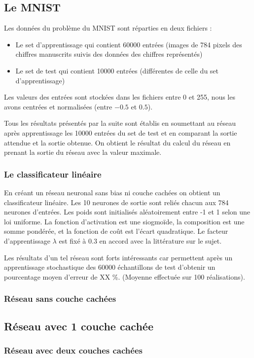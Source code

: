 
\subsection{Le MNIST}

Les données du problème du MNIST sont réparties en deux fichiers :
\begin{itemize}
    \item Le set d'apprentissage qui contient 60000 entrées (images de 784 pixels
          des chiffres manuscrits suivis des données des chiffres représentés)
    \item Le set de test qui contient 10000 entrées (différentes de celle du set
          d'apprentissage)
\end{itemize}

\medskip

Les valeurs des entrées sont stockées dans les fichiers entre 0 et 255, nous
les avons centrées et normalisées (entre $-0.5$ et $0.5$).

\medskip

Tous les résultats présentés par la suite sont établis en soumettant au réseau
après apprentissage les 10000 entrées du set de test et en comparant la sortie
attendue et la sortie obtenue. On obtient le résultat du calcul du réseau en
prenant la sortie du réseau avec la valeur maximale.

\subsubsection{Le classificateur linéaire}

En créant un réseau neuronal sans bias ni couche cachées on obtient un
classificateur linéaire. Les 10 neurones de sortie sont reliés chacun aux 784
neurones d'entrées. Les poids sont initialisés aléatoirement entre -1 et 1 selon
 une loi uniforme. La fonction d'activation est une siogmoïde, la composition
est une somme pondérée, et la fonction de coût est l'écart quadratique. Le
facteur d'apprentissage $\lambda$ est fixé à $0.3$ en accord avec la littérature
 sur le sujet.


\medskip

Les résultats d'un tel réseau sont forts intéressants car permettent après un
apprentissage stochastique des 60000 échantillons de test d'obtenir un
pourcentage moyen d'erreur de XX \%. (Moyenne effectuée sur 100 réalisations).


\subsubsection{Réseau sans couche cachées}

\subsection{Réseau avec 1 couche cachée}

\subsubsection{Réseau avec deux couches cachées}
